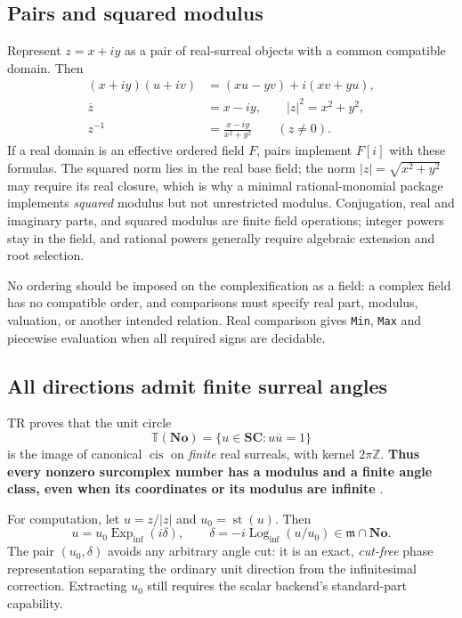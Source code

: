 \documentclass[11pt,letterpaper]{article}
\numberwithin{equation}{section}
\theoremstyle{definition}
\theoremstyle{remark}
\newcommand{\No}{\mathbf{No}}
\newcommand{\SC}{\mathbf{SC}}
\newcommand{\Z}{\mathbb Z}
\newcommand{\mm}{\mathfrak m}
\newcommand{\st}{\operatorname{st}}
\newcommand{\cis}{\operatorname{cis}}
\newcommand{\Expi}{\operatorname{Exp}_{\mathrm{inf}}}
\newcommand{\Logi}{\operatorname{Log}_{\mathrm{inf}}}
\begin{document}
\subsection{Pairs and squared modulus}
\label{cas:sub-pairs}
Represent $z=x+iy$ as a pair of real-surreal objects with a common compatible
domain. Then
\begin{align*}
 (x+iy)(u+iv)&=(xu-yv)+i(xv+yu),\\
 \overline z&=x-iy,\qquad |z|^2=x^2+y^2,\\
 z^{-1}&=\frac{x-iy}{x^2+y^2}\qquad(z\ne0).
\end{align*}
If a real domain is an effective ordered field $F$, pairs implement $F[i]$ with
these formulas. The squared norm lies in the real base field; the norm
$|z|=\sqrt{x^2+y^2}$ may require its real closure, which is why a minimal
rational-monomial package implements \emph{squared} modulus but not unrestricted
modulus. Conjugation, real and imaginary parts, and squared modulus are finite
field operations; integer powers stay in the field, and rational powers
generally require algebraic extension and root selection.

No ordering should be imposed on the complexification as a field: a complex
field has no compatible order, and comparisons must specify real part, modulus,
valuation, or another intended relation. Real comparison gives \texttt{Min},
\texttt{Max} and piecewise evaluation when all required signs are decidable.

\subsection{All directions admit finite surreal angles}
\label{cas:sub-finiteangle}
TR proves that the unit circle
\[
 \mathbb T(\No)=\{u\in\SC:u\overline u=1\}
\]
is the image of canonical $\cis$ on \emph{finite} real surreals, with kernel
$2\pi\Z$. \textbf{Thus every nonzero surcomplex number has a modulus and a
finite angle class, even when its coordinates or its modulus are infinite}
\cite{cas:SourceTrig}.

For computation, let $u=z/|z|$ and $u_0=\st(u)$. Then
\begin{equation}\label{cas:eq-anglesplit}
 u=u_0\Expi(i\delta),\qquad
 \delta=-i\Logi(u/u_0)\in\mm\cap\No .
\end{equation}
The pair $(u_0,\delta)$ avoids any arbitrary angle cut: it is an exact,
\emph{cut-free} phase representation separating the ordinary unit direction from
the infinitesimal correction. Extracting $u_0$ still requires the scalar
backend's standard-part capability.
\end{document}
